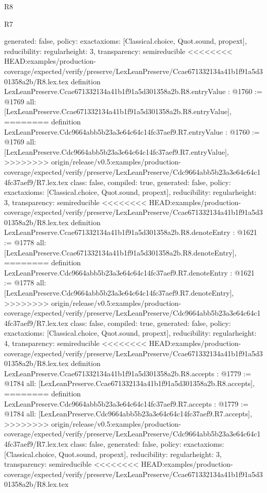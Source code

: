 \begin{lexlean}{R8}
\begin{lexlean}{R7}
\begin{coremodule}
{{{{{{{{{{{{{{{  generated: false,
  policy: exact{axioms: [Classical.choice, Quot.sound, propext]},
  reducibility: regular{height: 3},
  transparency: semireducible
}
<<<<<<<< HEAD:examples/production-coverage/expected/verify/preserve/LexLeanPreserve/Ccae671332134a41b1f91a5d301358a2b/R8.lex.tex
definition LexLeanPreserve.Ccae671332134a41b1f91a5d301358a2b.R8.entryValue : @1760 := @1769 {
  all: [LexLeanPreserve.Ccae671332134a41b1f91a5d301358a2b.R8.entryValue],
========
definition LexLeanPreserve.Cdc9664abb5b23a3e64c64c14fc37aef9.R7.entryValue : @1760 := @1769 {
  all: [LexLeanPreserve.Cdc9664abb5b23a3e64c64c14fc37aef9.R7.entryValue],
>>>>>>>> origin/release/v0.5:examples/production-coverage/expected/verify/preserve/LexLeanPreserve/Cdc9664abb5b23a3e64c64c14fc37aef9/R7.lex.tex
  class: false,
  compiled: true,
  generated: false,
  policy: exact{axioms: [Classical.choice, Quot.sound, propext]},
  reducibility: regular{height: 3},
  transparency: semireducible
}
<<<<<<<< HEAD:examples/production-coverage/expected/verify/preserve/LexLeanPreserve/Ccae671332134a41b1f91a5d301358a2b/R8.lex.tex
definition LexLeanPreserve.Ccae671332134a41b1f91a5d301358a2b.R8.denoteEntry : @1621 := @1778 {
  all: [LexLeanPreserve.Ccae671332134a41b1f91a5d301358a2b.R8.denoteEntry],
========
definition LexLeanPreserve.Cdc9664abb5b23a3e64c64c14fc37aef9.R7.denoteEntry : @1621 := @1778 {
  all: [LexLeanPreserve.Cdc9664abb5b23a3e64c64c14fc37aef9.R7.denoteEntry],
>>>>>>>> origin/release/v0.5:examples/production-coverage/expected/verify/preserve/LexLeanPreserve/Cdc9664abb5b23a3e64c64c14fc37aef9/R7.lex.tex
  class: false,
  compiled: true,
  generated: false,
  policy: exact{axioms: [Classical.choice, Quot.sound, propext]},
  reducibility: regular{height: 4},
  transparency: semireducible
}
<<<<<<<< HEAD:examples/production-coverage/expected/verify/preserve/LexLeanPreserve/Ccae671332134a41b1f91a5d301358a2b/R8.lex.tex
definition LexLeanPreserve.Ccae671332134a41b1f91a5d301358a2b.R8.accepts : @1779 := @1784 {
  all: [LexLeanPreserve.Ccae671332134a41b1f91a5d301358a2b.R8.accepts],
========
definition LexLeanPreserve.Cdc9664abb5b23a3e64c64c14fc37aef9.R7.accepts : @1779 := @1784 {
  all: [LexLeanPreserve.Cdc9664abb5b23a3e64c64c14fc37aef9.R7.accepts],
>>>>>>>> origin/release/v0.5:examples/production-coverage/expected/verify/preserve/LexLeanPreserve/Cdc9664abb5b23a3e64c64c14fc37aef9/R7.lex.tex
  class: false,
  generated: false,
  policy: exact{axioms: [Classical.choice, Quot.sound, propext]},
  reducibility: regular{height: 3},
  transparency: semireducible
}
<<<<<<<< HEAD:examples/production-coverage/expected/verify/preserve/LexLeanPreserve/Ccae671332134a41b1f91a5d301358a2b/R8.lex.tex
}}}}}}}}}}}}}}}}}
\end{coremodule}
\end{lexlean}
\end{lexlean}

